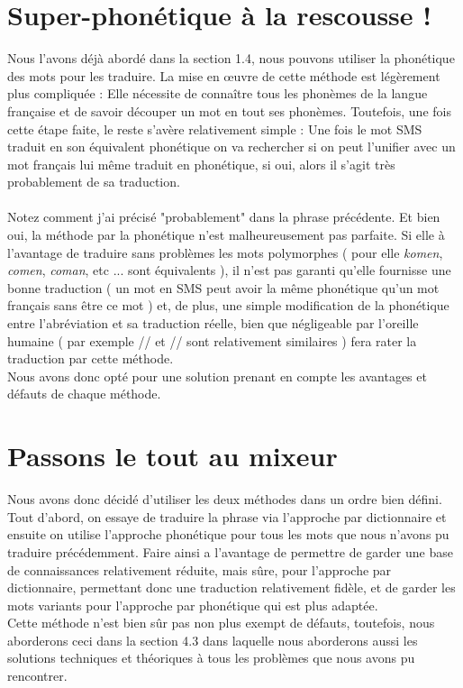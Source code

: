 \documentclass[11pt]{report}
\begin{document}
	\section{Super-phonétique à la rescousse !}
	Nous l'avons déjà abordé dans la section 1.4, nous pouvons utiliser la phonétique des mots pour les traduire.
	La mise en œuvre de cette méthode est légèrement plus compliquée : Elle nécessite de connaître tous les phonèmes de la langue française et de savoir découper un mot en tout ses phonèmes. Toutefois, une fois cette étape faite, le reste s'avère relativement simple : Une fois le mot SMS traduit en son équivalent phonétique on va rechercher si on peut l'unifier avec un mot français lui même traduit en phonétique, si oui, alors il s'agit très probablement de sa traduction.
	\paragraph{} Notez comment j'ai précisé "probablement" dans la phrase précédente. Et bien oui, la méthode par la phonétique n'est malheureusement pas parfaite. Si elle à l'avantage de traduire sans problèmes les mots polymorphes ( pour elle {\em komen}, {\em comen}, {\em coman}, etc ... sont équivalents ), il n'est pas garanti qu'elle fournisse une bonne traduction ( un mot en SMS peut avoir la même phonétique qu'un mot français sans être ce mot ) et, de plus, une simple modification de la phonétique entre l'abréviation et sa traduction réelle, bien que négligeable par l'oreille humaine ( par exemple // et // sont relativement similaires ) fera rater la traduction par cette méthode.\\
	Nous avons donc opté pour une solution prenant en compte les avantages et défauts de chaque méthode.
	
	\section{Passons le tout au mixeur}
	Nous avons donc décidé d'utiliser les deux méthodes dans un ordre bien défini. Tout d'abord, on essaye de traduire la phrase via l'approche par dictionnaire et ensuite on utilise l'approche phonétique pour tous les mots que nous n'avons pu traduire précédemment. Faire ainsi a l'avantage de permettre de garder une base de connaissances relativement réduite, mais sûre, pour l'approche par dictionnaire, permettant donc une traduction relativement fidèle, et de garder les mots variants pour l'approche par phonétique qui est plus adaptée.\\
	Cette méthode n'est bien sûr pas non plus exempt de défauts, toutefois, nous aborderons ceci dans la section 4.3 dans laquelle nous aborderons aussi les solutions techniques et théoriques à tous les problèmes que nous avons pu rencontrer.
\end{document}
